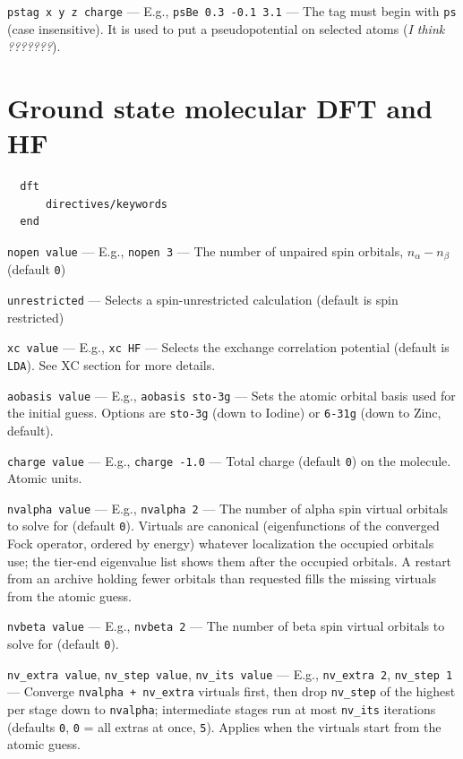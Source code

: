 \documentclass[letterpaper]{book}
\begin{document}
{\tt pstag x y z charge} --- E.g., {\tt psBe 0.3 -0.1 3.1} --- The tag must begin with {\tt ps} (case insensitive).  It is used to put a pseudopotential on selected atoms ({\em I think ???????}).


\chapter{Ground state molecular DFT and HF}

\begin{verbatim}
  dft
      directives/keywords
  end
\end{verbatim}

{\tt nopen value} --- E.g., {\tt nopen 3} --- The number of unpaired spin orbitals, $n_\alpha - n_\beta$ (default {\tt 0})

{\tt unrestricted} --- Selects a spin-unrestricted calculation (default is spin restricted)

{\tt xc value} --- E.g., {\tt xc HF} --- Selects the exchange correlation potential (default is {\tt LDA}). See XC section for more details.

{\tt aobasis value} --- E.g., {\tt aobasis sto-3g} --- Sets the atomic orbital basis used for the initial guess.  Options are {\tt sto-3g} (down to Iodine)  or {\tt 6-31g} (down to Zinc, default).  

{\tt charge value} --- E.g., {\tt charge -1.0} --- Total charge (default {\tt 0}) on the molecule. Atomic units.

{\tt nvalpha value} --- E.g., {\tt nvalpha 2} --- The number of alpha spin virtual orbitals to solve for (default {\tt 0}). Virtuals are canonical (eigenfunctions of the converged Fock operator, ordered by energy) whatever localization the occupied orbitals use; the tier-end eigenvalue list shows them after the occupied orbitals. A restart from an archive holding fewer orbitals than requested fills the missing virtuals from the atomic guess.

{\tt nvbeta value} --- E.g., {\tt nvbeta 2} --- The number of beta spin virtual orbitals to solve for (default {\tt 0}).

{\tt nv\_extra value}, {\tt nv\_step value}, {\tt nv\_its value} --- E.g., {\tt nv\_extra 2}, {\tt nv\_step 1} --- Converge {\tt nvalpha + nv\_extra} virtuals first, then drop {\tt nv\_step} of the highest per stage down to {\tt nvalpha}; intermediate stages run at most {\tt nv\_its} iterations (defaults {\tt 0}, {\tt 0} = all extras at once, {\tt 5}). Applies when the virtuals start from the atomic guess.
\end{document}
